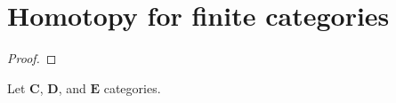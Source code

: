 \chapter{Homotopy for finite categories}

\begin{definition}
    
\end{definition}

\begin{definition}[Homotopy]
    
\end{definition}

\begin{theorem}
    
\end{theorem}

\begin{proof}
    
\end{proof}

\begin{definition}
    
\end{definition}

\begin{lemma}
    Let \(\mathbf{C}\), \(\mathbf{D}\), and \(\mathbf{E} \) categories.
\end{lemma}


\begin{definition}
    
\end{definition}